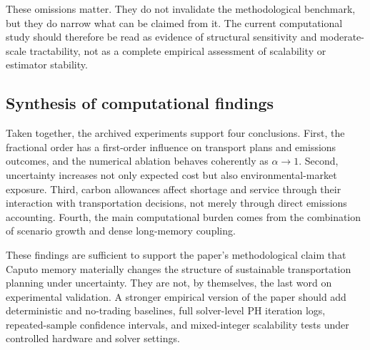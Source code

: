 These omissions matter. They do not invalidate the methodological benchmark, but they do narrow what can be claimed from it. The current computational study should therefore be read as evidence of structural sensitivity and moderate-scale tractability, not as a complete empirical assessment of scalability or estimator stability.

\subsection{Synthesis of computational findings}
Taken together, the archived experiments support four conclusions. First, the fractional order has a first-order influence on transport plans and emissions outcomes, and the numerical ablation behaves coherently as $\alpha\to 1$. Second, uncertainty increases not only expected cost but also environmental-market exposure. Third, carbon allowances affect shortage and service through their interaction with transportation decisions, not merely through direct emissions accounting. Fourth, the main computational burden comes from the combination of scenario growth and dense long-memory coupling.

These findings are sufficient to support the paper's methodological claim that Caputo memory materially changes the structure of sustainable transportation planning under uncertainty. They are not, by themselves, the last word on experimental validation. A stronger empirical version of the paper should add deterministic and no-trading baselines, full solver-level PH iteration logs, repeated-sample confidence intervals, and mixed-integer scalability tests under controlled hardware and solver settings.
